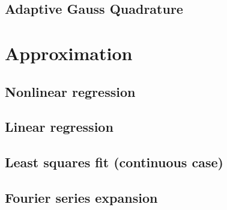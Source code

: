 \documentclass{article}
\begin{document}
\subsection{Adaptive Gauss Quadrature}



\section{Approximation}


\subsection{Nonlinear regression}


\subsection{Linear regression}

\subsection{Least squares fit (continuous case)}


\subsection{Fourier series expansion}
\end{document}
